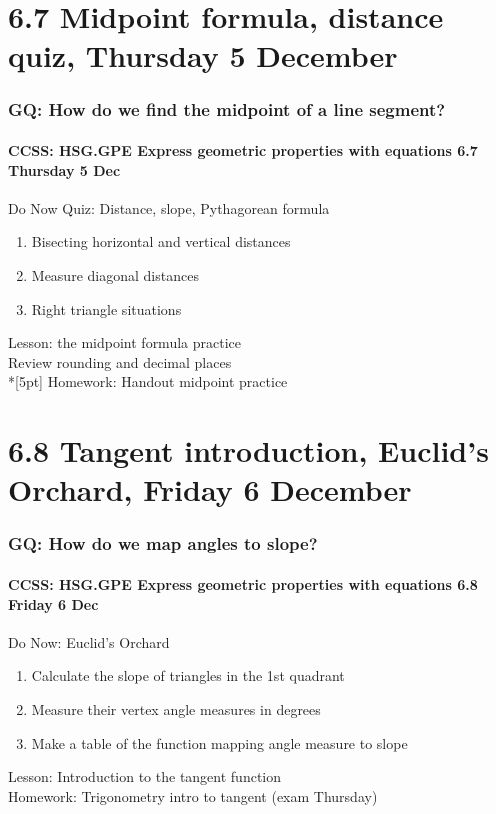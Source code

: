 \documentclass{beamer}
\begin{document}
\section{6.7 Midpoint formula, distance quiz, Thursday 5 December}
\frame
{
  \frametitle{GQ: How do we find the midpoint of a line segment?}
  \framesubtitle{CCSS: HSG.GPE Express geometric properties with equations \hfill \alert{6.7 Thursday 5 Dec}}

  \begin{block}{Do Now Quiz: Distance, slope, Pythagorean formula}
  \begin{enumerate}
    \item Bisecting horizontal and vertical distances
    \item Measure diagonal distances
    \item Right triangle situations
  \end{enumerate}
  \end{block}
  Lesson: the midpoint formula practice\\
  Review rounding and decimal places \\*[5pt]
  Homework: Handout midpoint practice
}

\section{6.8 Tangent introduction, Euclid's Orchard, Friday 6 December}
\frame
{
  \frametitle{GQ: How do we map angles to slope?}
  \framesubtitle{CCSS: HSG.GPE Express geometric properties with equations \hfill \alert{6.8 Friday 6 Dec}}

  \begin{block}{Do Now: Euclid's Orchard}
  \begin{enumerate}
    \item Calculate the slope of triangles in the 1st quadrant
    \item Measure their vertex angle measures in degrees
    \item Make a table of the function mapping angle measure to slope
  \end{enumerate}
  \end{block}
  Lesson: Introduction to the tangent function \\
  Homework: Trigonometry intro to tangent (\alert{exam Thursday})
}
\end{document}
